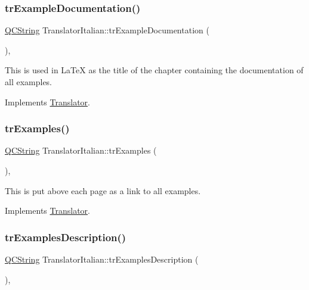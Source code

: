 \subsubsection{\texorpdfstring{trExampleDocumentation()}{trExampleDocumentation()}}
{\footnotesize\ttfamily \mbox{\hyperlink{class_q_c_string}{Q\+C\+String}} Translator\+Italian\+::tr\+Example\+Documentation (\begin{DoxyParamCaption}{ }\end{DoxyParamCaption})\hspace{0.3cm}{\ttfamily [inline]}, {\ttfamily [virtual]}}

This is used in La\+TeX as the title of the chapter containing the documentation of all examples. 

Implements \mbox{\hyperlink{class_translator}{Translator}}.

\mbox{\label{class_translator_italian_ae87f35c3c0d43ba328a32fa20058b4c3}} 
\subsubsection{\texorpdfstring{trExamples()}{trExamples()}}
{\footnotesize\ttfamily \mbox{\hyperlink{class_q_c_string}{Q\+C\+String}} Translator\+Italian\+::tr\+Examples (\begin{DoxyParamCaption}{ }\end{DoxyParamCaption})\hspace{0.3cm}{\ttfamily [inline]}, {\ttfamily [virtual]}}

This is put above each page as a link to all examples. 

Implements \mbox{\hyperlink{class_translator}{Translator}}.

\mbox{\label{class_translator_italian_a0d2bdf692fbe641b56c0ddb85e5cf882}} 
\subsubsection{\texorpdfstring{trExamplesDescription()}{trExamplesDescription()}}
{\footnotesize\ttfamily \mbox{\hyperlink{class_q_c_string}{Q\+C\+String}} Translator\+Italian\+::tr\+Examples\+Description (\begin{DoxyParamCaption}{ }\end{DoxyParamCaption})\hspace{0.3cm}{\ttfamily [inline]}, {\ttfamily [virtual]}}

